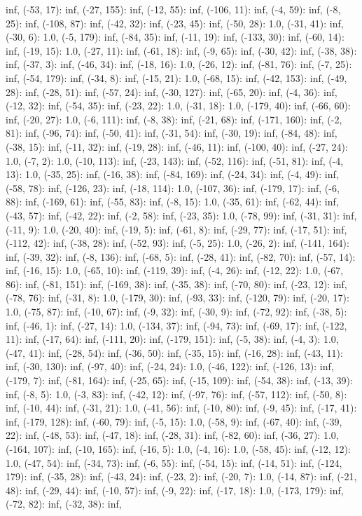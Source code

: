 \documentclass[parskip=half]{scrartcl}
\begin{document}
inf, (-53, 17): inf, (-27, 155): inf, (-12, 55): inf, (-106, 11): inf, (-4, 59): inf, (-8, 25): inf, (-108, 87): inf, (-42, 32): inf, (-23, 45): inf, (-50, 28): 1.0, (-31, 41): inf, (-30, 6): 1.0, (-5, 179): inf, (-84, 35): inf, (-11, 19): inf, (-133, 30): inf, (-60, 14): inf, (-19, 15): 1.0, (-27, 11): inf, (-61, 18): inf, (-9, 65): inf, (-30, 42): inf, (-38, 38): inf, (-37, 3): inf, (-46, 34): inf, (-18, 16): 1.0, (-26, 12): inf, (-81, 76): inf, (-7, 25): inf, (-54, 179): inf, (-34, 8): inf, (-15, 21): 1.0, (-68, 15): inf, (-42, 153): inf, (-49, 28): inf, (-28, 51): inf, (-57, 24): inf, (-30, 127): inf, (-65, 20): inf, (-4, 36): inf, (-12, 32): inf, (-54, 35): inf, (-23, 22): 1.0, (-31, 18): 1.0, (-179, 40): inf, (-66, 60): inf, (-20, 27): 1.0, (-6, 111): inf, (-8, 38): inf, (-21, 68): inf, (-171, 160): inf, (-2, 81): inf, (-96, 74): inf, (-50, 41): inf, (-31, 54): inf, (-30, 19): inf, (-84, 48): inf, (-38, 15): inf, (-11, 32): inf, (-19, 28): inf, (-46, 11): inf, (-100, 40): inf, (-27, 24): 1.0, (-7, 2): 1.0, (-10, 113): inf, (-23, 143): inf, (-52, 116): inf, (-51, 81): inf, (-4, 13): 1.0, (-35, 25): inf, (-16, 38): inf, (-84, 169): inf, (-24, 34): inf, (-4, 49): inf, (-58, 78): inf, (-126, 23): inf, (-18, 114): 1.0, (-107, 36): inf, (-179, 17): inf, (-6, 88): inf, (-169, 61): inf, (-55, 83): inf, (-8, 15): 1.0, (-35, 61): inf, (-62, 44): inf, (-43, 57): inf, (-42, 22): inf, (-2, 58): inf, (-23, 35): 1.0, (-78, 99): inf, (-31, 31): inf, (-11, 9): 1.0, (-20, 40): inf, (-19, 5): inf, (-61, 8): inf, (-29, 77): inf, (-17, 51): inf, (-112, 42): inf, (-38, 28): inf, (-52, 93): inf, (-5, 25): 1.0, (-26, 2): inf, (-141, 164): inf, (-39, 32): inf, (-8, 136): inf, (-68, 5): inf, (-28, 41): inf, (-82, 70): inf, (-57, 14): inf, (-16, 15): 1.0, (-65, 10): inf, (-119, 39): inf, (-4, 26): inf, (-12, 22): 1.0, (-67, 86): inf, (-81, 151): inf, (-169, 38): inf, (-35, 38): inf, (-70, 80): inf, (-23, 12): inf, (-78, 76): inf, (-31, 8): 1.0, (-179, 30): inf, (-93, 33): inf, (-120, 79): inf, (-20, 17): 1.0, (-75, 87): inf, (-10, 67): inf, (-9, 32): inf, (-30, 9): inf, (-72, 92): inf, (-38, 5): inf, (-46, 1): inf, (-27, 14): 1.0, (-134, 37): inf, (-94, 73): inf, (-69, 17): inf, (-122, 11): inf, (-17, 64): inf, (-111, 20): inf, (-179, 151): inf, (-5, 38): inf, (-4, 3): 1.0, (-47, 41): inf, (-28, 54): inf, (-36, 50): inf, (-35, 15): inf, (-16, 28): inf, (-43, 11): inf, (-30, 130): inf, (-97, 40): inf, (-24, 24): 1.0, (-46, 122): inf, (-126, 13): inf, (-179, 7): inf, (-81, 164): inf, (-25, 65): inf, (-15, 109): inf, (-54, 38): inf, (-13, 39): inf, (-8, 5): 1.0, (-3, 83): inf, (-42, 12): inf, (-97, 76): inf, (-57, 112): inf, (-50, 8): inf, (-10, 44): inf, (-31, 21): 1.0, (-41, 56): inf, (-10, 80): inf, (-9, 45): inf, (-17, 41): inf, (-179, 128): inf, (-60, 79): inf, (-5, 15): 1.0, (-58, 9): inf, (-67, 40): inf, (-39, 22): inf, (-48, 53): inf, (-47, 18): inf, (-28, 31): inf, (-82, 60): inf, (-36, 27): 1.0, (-164, 107): inf, (-10, 165): inf, (-16, 5): 1.0, (-4, 16): 1.0, (-58, 45): inf, (-12, 12): 1.0, (-47, 54): inf, (-34, 73): inf, (-6, 55): inf, (-54, 15): inf, (-14, 51): inf, (-124, 179): inf, (-35, 28): inf, (-43, 24): inf, (-23, 2): inf, (-20, 7): 1.0, (-14, 87): inf, (-21, 48): inf, (-29, 44): inf, (-10, 57): inf, (-9, 22): inf, (-17, 18): 1.0, (-173, 179): inf, (-72, 82): inf, (-32, 38): inf, 
\end{document}

